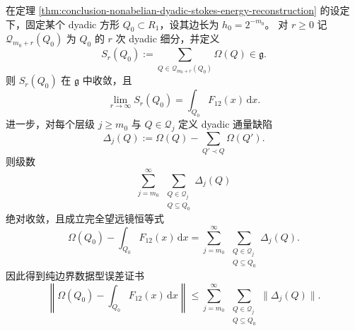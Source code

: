 \begin{theorem}\label{thm:conclusion-nonabelian-dyadic-flux-defect-telescoping}
在定理 \ref{thm:conclusion-nonabelian-dyadic-stokes-energy-reconstruction} 的设定下，固定某个 dyadic 方形 \(Q_0\subset R_1\)，设其边长为 \(h_0=2^{-m_0}\)。
对 \(r\ge 0\) 记 \(\mathcal Q_{m_0+r}(Q_0)\) 为 \(Q_0\) 的 \(r\) 次 dyadic 细分，并定义
\[
S_r(Q_0):=\sum_{Q\in\mathcal Q_{m_0+r}(Q_0)}\Omega(Q)\in\mathfrak g.
\]
则 \(S_r(Q_0)\) 在 \(\mathfrak g\) 中收敛，且
\[
\lim_{r\to\infty}S_r(Q_0)=\int_{Q_0}F_{12}(x)\,\mathrm d x.
\]
进一步，对每个层级 \(j\ge m_0\) 与 \(Q\in\mathcal Q_j\) 定义 dyadic 通量缺陷
\[
\Delta_j(Q):=\Omega(Q)-\sum_{Q'\prec Q}\Omega(Q').
\]
则级数
\[
\sum_{j=m_0}^{\infty}\ \sum_{\substack{Q\in\mathcal Q_j\\ Q\subseteq Q_0}}\Delta_j(Q)
\]
绝对收敛，且成立完全望远镜恒等式
\[
\Omega(Q_0)-\int_{Q_0}F_{12}(x)\,\mathrm d x
=
\sum_{j=m_0}^{\infty}\ \sum_{\substack{Q\in\mathcal Q_j\\ Q\subseteq Q_0}}\Delta_j(Q).
\]
因此得到纯边界数据型误差证书
\[
\left\|
\Omega(Q_0)-\int_{Q_0}F_{12}(x)\,\mathrm d x
\right\|
\le
\sum_{j=m_0}^{\infty}\ \sum_{\substack{Q\in\mathcal Q_j\\ Q\subseteq Q_0}}
\|\Delta_j(Q)\|.
\]
\end{theorem}
